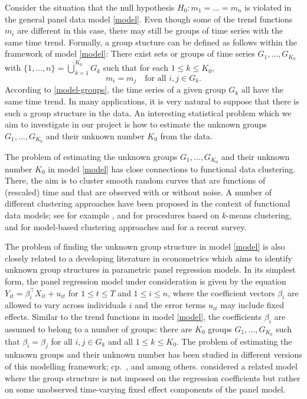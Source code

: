 \documentclass[a4paper,12pt]{article}
\begin{document}
\noindent Consider the situation that the null hypothesis $H_0: m_1 = \ldots = m_n$ is violated in the general panel data model \eqref{model}. Even though some of the trend functions $m_i$ are different in this case, there may still be groups of time series with the same time trend. Formally, a group stucture can be defined as follows within the framework of model \eqref{model}: There exist sets or groups of time series $G_1,\ldots,G_{K_0}$ with $\{1,\ldots,n\} = \dot\bigcup_{k=1}^{K_0} G_k$ such that for each $1 \le k \le K_0$, 
\begin{equation}\label{model-groups}
m_i = m_j \quad \text{for all } i,j \in G_k. 
\end{equation}
According to \eqref{model-groups}, the time series of a given group $G_k$ all have the same time trend. In many applications, it is very natural to suppose that there is such a group structure in the data. An interesting statistical problem which we aim to investigate in our project is how to estimate the unknown groups $G_1,\ldots,G_{K_0}$ and their unknown number $K_0$ from the data. 


The problem of estimating the unknown groups $G_1,\ldots,G_{K_0}$ and their unknown number $K_0$ in model \eqref{model} has close connections to functional data clustering. There, the aim is to cluster smooth random curves that are functions of (rescaled) time and that are observed with or without noise. A number of different clustering approaches have been proposed in the context of functional data models; see for example \cite{Abraham2003}, \cite{Tarpey2003} and \cite{Tarpey2007} for procedures based on $k$-means clustering, \cite{James2003} and \cite{Chiou2007} for model-based clustering approaches and \cite{Jacques2014} for a recent survey. 


The problem of finding the unknown group structure in model \eqref{model} is also closely related to a developing literature in econometrics which aims to identify unknown group structures in parametric panel regression models. In its simplest form, the panel regression model under consideration is given by the equation $Y_{it} = \beta_i^\top X_{it} + u_{it}$ for $1 \le t \le T$ and $1 \le i \le n$, where the coefficient vectors $\beta_i$ are allowed to vary across individuals $i$ and the error terms $u_{it}$ may include fixed effects. Similar to the trend functions in model \eqref{model}, the coefficients $\beta_i$ are assumed to belong to a number of groups: there are $K_0$ groups $G_1,\ldots,G_{K_0}$ such that $\beta_i = \beta_j$ for all $i,j \in G_k$ and all $1\le k \le K_0$. The problem of estimating the unknown groups and their unknown number has been studied in different versions of this modelling framework; cp.\ \cite{Su2016}, \cite{Su2018} and \cite{Wang2018} among others. \cite{Bonhomme2015} considered a related model where the group structure is not imposed on the regression coefficients but rather on some unobserved time-varying fixed effect components of the panel model. 
\end{document}
